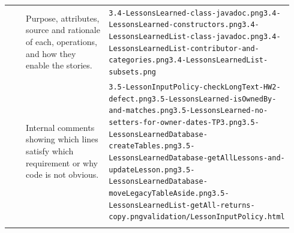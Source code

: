 \documentclass[10pt]{article}
\begin{document}
\begin{longtable}{@{}>{\raggedright\arraybackslash}p{0.07\linewidth} >{\raggedright\arraybackslash}p{0.33\linewidth} >{\raggedright\arraybackslash}p{0.54\linewidth}@{}}
3.4 & Purpose, attributes, source and rationale of each, operations, and how they enable the stories. & {\scriptsize \texttt{3.4-LessonsLearned-class-javadoc.png}\newline \texttt{3.4-LessonsLearned-constructors.png}\newline \texttt{3.4-LessonsLearnedList-class-javadoc.png}\newline \texttt{3.4-LessonsLearnedList-contributor-and-categories.png}\newline \texttt{3.4-LessonsLearnedList-subsets.png}} \\ \addlinespace[3pt]
3.5 & Internal comments showing which lines satisfy which requirement or why code is not obvious. & {\scriptsize \texttt{3.5-LessonInputPolicy-checkLongText-HW2-defect.png}\newline \texttt{3.5-LessonsLearned-isOwnedBy-and-matches.png}\newline \texttt{3.5-LessonsLearned-no-setters-for-owner-dates-TP3.png}\newline \texttt{3.5-LessonsLearnedDatabase-createTables.png}\newline \texttt{3.5-LessonsLearnedDatabase-getAllLessons-and-updateLesson.png}\newline \texttt{3.5-LessonsLearnedDatabase-moveLegacyTableAside.png}\newline \texttt{3.5-LessonsLearnedList-getAll-returns-copy.png}\newline \texttt{validation/LessonInputPolicy.html}} \\ \addlinespace[3pt]
\bottomrule\end{longtable}
\end{document}
